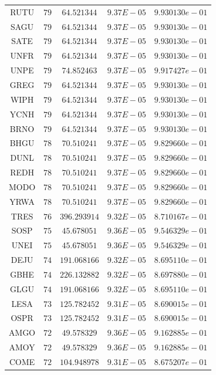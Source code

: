 \documentclass{statsoc}
\begin{document}
\begin{table}
{\begin{tabular}{*{5}{c}}
RUTU  &  $79$  &  $64.521344$  &  $9.37E-05$  &  $9.930130e-01$\\
SAGU  &  $79$  &  $64.521344$  &  $9.37E-05$  &  $9.930130e-01$\\
SATE  &  $79$  &  $64.521344$  &  $9.37E-05$  &  $9.930130e-01$\\
UNFR  &  $79$  &  $64.521344$  &  $9.37E-05$  &  $9.930130e-01$\\
UNPE  &  $79$  &  $74.852463$  &  $9.37E-05$  &  $9.917427e-01$\\
GREG  &  $79$  &  $64.521344$  &  $9.37E-05$  &  $9.930130e-01$\\
WIPH  &  $79$  &  $64.521344$  &  $9.37E-05$  &  $9.930130e-01$\\
YCNH  &  $79$  &  $64.521344$  &  $9.37E-05$  &  $9.930130e-01$\\
BRNO  &  $79$  &  $64.521344$  &  $9.37E-05$  &  $9.930130e-01$\\
BHGU  &  $78$  &  $70.510241$  &  $9.37E-05$  &  $9.829660e-01$\\
DUNL  &  $78$  &  $70.510241$  &  $9.37E-05$  &  $9.829660e-01$\\
REDH  &  $78$  &  $70.510241$  &  $9.37E-05$  &  $9.829660e-01$\\
MODO  &  $78$  &  $70.510241$  &  $9.37E-05$  &  $9.829660e-01$\\
YRWA  &  $78$  &  $70.510241$  &  $9.37E-05$  &  $9.829660e-01$\\
TRES  &  $76$  &  $396.293914$  &  $9.32E-05$  &  $8.710167e-01$\\
SOSP  &  $75$  &  $45.678051$  &  $9.36E-05$  &  $9.546329e-01$\\
UNEI  &  $75$  &  $45.678051$  &  $9.36E-05$  &  $9.546329e-01$\\
DEJU  &  $74$  &  $191.068166$  &  $9.32E-05$  &  $8.695110e-01$\\
GBHE  &  $74$  &  $226.132882$  &  $9.32E-05$  &  $8.697880e-01$\\
GLGU  &  $74$  &  $191.068166$  &  $9.32E-05$  &  $8.695110e-01$\\
LESA  &  $73$  &  $125.782452$  &  $9.31E-05$  &  $8.690015e-01$\\
OSPR  &  $73$  &  $125.782452$  &  $9.31E-05$  &  $8.690015e-01$\\
AMGO  &  $72$  &  $49.578329$  &  $9.36E-05$  &  $9.162885e-01$\\
AMOY  &  $72$  &  $49.578329$  &  $9.36E-05$  &  $9.162885e-01$\\
COME  &  $72$  &  $104.948978$  &  $9.31E-05$  &  $8.675207e-01$\\

\end{tabular}}
\end{table}
\end{document}
